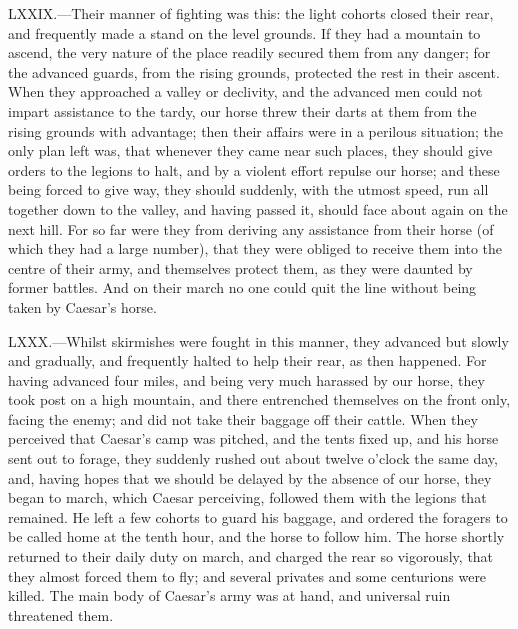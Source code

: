 LXXIX.—Their manner of fighting was this: the light cohorts closed
their rear, and frequently made a stand on the level grounds. If they
had a mountain to ascend, the very nature of the place readily secured
them from any danger; for the advanced guards, from the rising grounds,
protected the rest in their ascent. When they approached a valley or
declivity, and the advanced men could not impart assistance to the
tardy, our horse threw their darts at them from the rising grounds with
advantage; then their affairs were in a perilous situation; the only
plan left was, that whenever they came near such places, they should
give orders to the legions to halt, and by a violent effort repulse our
horse; and these being forced to give way, they should suddenly, with
the utmost speed, run all together down to the valley, and having passed
it, should face about again on the next hill. For so far were they from
deriving any assistance from their horse (of which they had a large
number), that they were obliged to receive them into the centre of their
army, and themselves protect them, as they were daunted by former
battles. And on their march no one could quit the line without being
taken by Caesar's horse.

LXXX.—Whilst skirmishes were fought in this manner, they advanced but
slowly and gradually, and frequently halted to help their rear, as then
happened. For having advanced four miles, and being very much harassed
by our horse, they took post on a high mountain, and there entrenched
themselves on the front only, facing the enemy; and did not take their
baggage off their cattle. When they perceived that Caesar's camp was
pitched, and the tents fixed up, and his horse sent out to forage, they
suddenly rushed out about twelve o'clock the same day, and, having hopes
that we should be delayed by the absence of our horse, they began to
march, which Caesar perceiving, followed them with the legions that
remained. He left a few cohorts to guard his baggage, and ordered the
foragers to be called home at the tenth hour, and the horse to follow
him. The horse shortly returned to their daily duty on march, and
charged the rear so vigorously, that they almost forced them to fly; and
several privates and some centurions were killed. The main body of
Caesar's army was at hand, and universal ruin threatened them.

